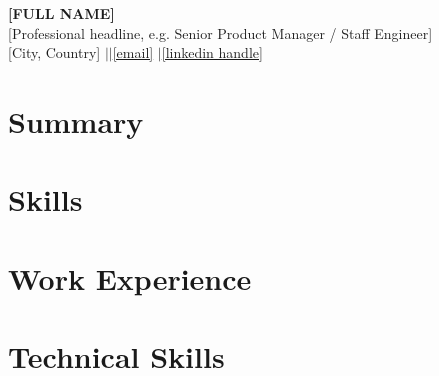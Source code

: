 \documentclass[10pt,a4paper]{article}
\newcommand{\jobheading}[2]{%
  \vspace{5pt}%
  {\color{accentcolor}\textbf{#1}} \hfill \textbf{#2}%
  \vspace{-4pt}%
  \\{\color{lightrule}\hrule height 0.5pt}%
  \vspace{2pt}%
}
\newcommand{\jobtitle}[1]{\textbf{#1}}
\begin{document}
\begin{center}
  {\LARGE\bfseries [FULL NAME]} \\[3pt]
  {\large [Professional headline, e.g. Senior Product Manager / Staff Engineer]} \\[6pt]
  {\small [City, Country] \quad$|$\quad [Phone] \quad$|$\quad \href{mailto:[email]}{[email]} \quad$|$\quad \href{[LinkedIn URL]}{[linkedin handle]}}
\end{center}

\section{Summary}

\section{Skills}

\section{Work Experience}

\section{Technical Skills}

\end{document}
